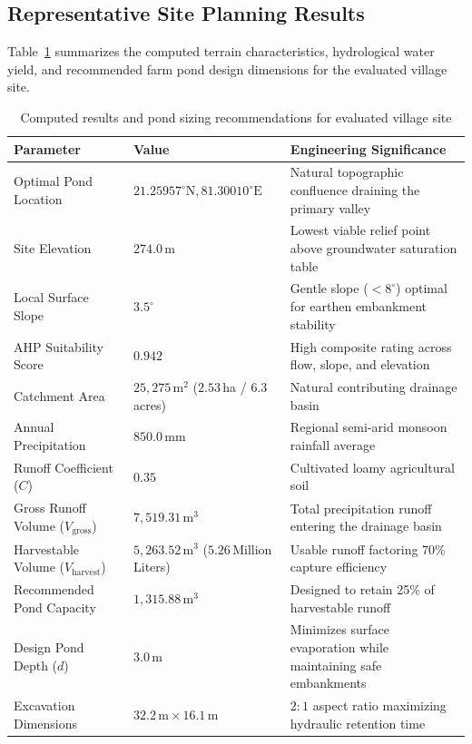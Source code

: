 \documentclass[manuscript,screen,review]{acmart}
\begin{document}
\subsection{Representative Site Planning Results}
Table~\ref{tab:results} summarizes the computed terrain characteristics, hydrological water yield, and recommended farm pond design dimensions for the evaluated village site.

\begin{table}[h]
  \caption{Computed results and pond sizing recommendations for evaluated village site}
  \label{tab:results}
  \small
  \begin{tabular}{llp{6.8cm}}
    \toprule
    Parameter & Value & Engineering Significance \\
    \midrule
    Optimal Pond Location & $21.25957^\circ\text{N}, 81.30010^\circ\text{E}$ & Natural topographic confluence draining the primary valley \\
    Site Elevation & $274.0$\,m & Lowest viable relief point above groundwater saturation table \\
    Local Surface Slope & $3.5^\circ$ & Gentle slope ($<8^\circ$) optimal for earthen embankment stability \\
    AHP Suitability Score & $0.942$ & High composite rating across flow, slope, and elevation \\
    Catchment Area & $25,275\,\text{m}^2$ ($2.53$\,ha / $6.3$\,acres) & Natural contributing drainage basin \\
    Annual Precipitation & $850.0$\,mm & Regional semi-arid monsoon rainfall average \\
    Runoff Coefficient ($C$) & $0.35$ & Cultivated loamy agricultural soil \\
    Gross Runoff Volume ($V_{\text{gross}}$) & $7,519.31\,\text{m}^3$ & Total precipitation runoff entering the drainage basin \\
    Harvestable Volume ($V_{\text{harvest}}$) & $5,263.52\,\text{m}^3$ ($5.26$\,Million Liters) & Usable runoff factoring 70\% capture efficiency \\
    Recommended Pond Capacity & $1,315.88\,\text{m}^3$ & Designed to retain 25\% of harvestable runoff \\
    Design Pond Depth ($d$) & $3.0$\,m & Minimizes surface evaporation while maintaining safe embankments \\
    Excavation Dimensions & $32.2\,\text{m} \times 16.1\,\text{m}$ & $2:1$ aspect ratio maximizing hydraulic retention time \\
    \bottomrule
  \end{tabular}
\end{table}
\end{document}
